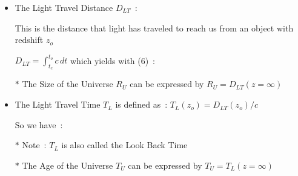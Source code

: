 \Tr
\onecolumn
\begin{itemize}
\item The {\blue Light Travel Distance $D_{LT}$}~:
\item[] This is the distance that light has traveled to reach us from an object with redshift $z_{o}$
\item[] $\displaystyle D_{LT}=\int_{t_{e}}^{t_{o}} c\,dt$ which yields with (6)~:
\item[] \begin{center}
        {\red {}}
        \end{center}
\item[$\ast$] The {\blue Size of the Universe $R_{U}$} can be expressed by {\blue $R_{U}=D_{LT}(z=\infty)$} 
\item The {\blue Light Travel Time $T_{L}$} is defined as~: {\blue $T_{L}(z_{o})=D_{LT}(z_{o})/c$}
\item[] So we have~:
\item[] \begin{center}
        {\red {}}
        \end{center}
\item[$\ast$] Note~: {\blue $T_{L}$} is also called the {\blue Look Back Time}
\item[$\ast$] The {\blue Age of the Universe $T_{U}$} can be expressed by {\blue $T_{U}=T_{L}(z=\infty)$} 
\end{itemize}

